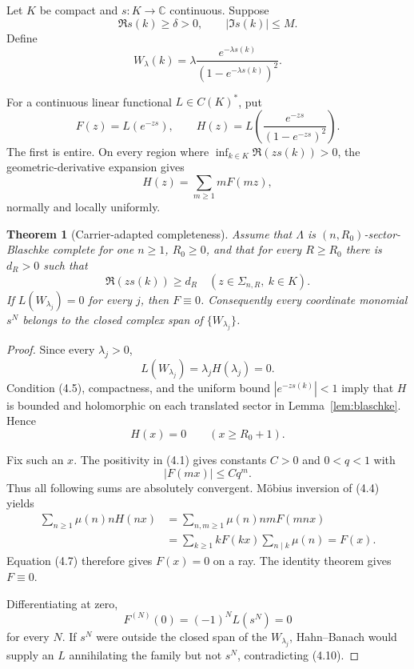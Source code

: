 \documentclass[11pt]{article}
\newtheorem{theorem}{Theorem}[section]
\newcommand{\C}{\mathbb C}
\begin{document}
Let \(K\) be compact and \(s:K\to\C\) continuous.  Suppose
\[
 \Re s(k)\geq\delta>0,\qquad |\Im s(k)|\leq M.
 \tag{4.1}
\]
Define
\[
 W_\lambda(k)
 =\lambda\frac{e^{-\lambda s(k)}}{(1-e^{-\lambda s(k)})^2}.
 \tag{4.2}
\]

For a continuous linear functional \(L\in C(K)^*\), put
\[
 F(z)=L(e^{-zs}),\qquad
 H(z)=L\!\left(\frac{e^{-zs}}{(1-e^{-zs})^2}\right).
 \tag{4.3}
\]
The first is entire.  On every region where
\(\inf_{k\in K}\Re(zs(k))>0\), the geometric-derivative expansion gives
\[
 H(z)=\sum_{m\geq1}mF(mz),
 \tag{4.4}
\]
normally and locally uniformly.

\begin{theorem}[Carrier-adapted completeness]\label{thm:carrier}
Assume that \(\Lambda\) is \((n,R_0)\)-sector-Blaschke complete for one
\(n\geq1\), \(R_0\geq0\), and that for every \(R\geq R_0\) there is
\(d_R>0\) such that
\[
 \Re(zs(k))\geq d_R
 \quad(z\in\Sigma_{n,R},\ k\in K).
 \tag{4.5}
\]
If \(L(W_{\lambda_j})=0\) for every \(j\), then \(F\equiv0\).  Consequently
every coordinate monomial \(s^N\) belongs to the closed complex span of
\(\{W_{\lambda_j}\}\).
\end{theorem}

\begin{proof}
Since every \(\lambda_j>0\),
\[
 L(W_{\lambda_j})=\lambda_j H(\lambda_j)=0.
 \tag{4.6}
\]
Condition (4.5), compactness, and the uniform bound
\(|e^{-zs(k)}|<1\) imply that \(H\) is bounded and holomorphic on each
translated sector in Lemma~\ref{lem:blaschke}.  Hence
\[
 H(x)=0\qquad(x\geq R_0+1).
 \tag{4.7}
\]

Fix such an \(x\).  The positivity in (4.1) gives constants \(C>0\) and
\(0<q<1\) with
\[
 |F(mx)|\leq Cq^m.
 \tag{4.8}
\]
Thus all following sums are absolutely convergent.  M\"obius inversion of
\textup{(4.4)} yields
\[
\begin{aligned}
 \sum_{n\geq1}\mu(n)nH(nx)
 &=\sum_{n,m\geq1}\mu(n)nmF(mnx)\\
 &=\sum_{k\geq1}kF(kx)\sum_{n\mid k}\mu(n)
 =F(x).
\end{aligned}
\tag{4.9}
\]
Equation (4.7) therefore gives \(F(x)=0\) on a ray.  The identity theorem gives
\(F\equiv0\).

Differentiating at zero,
\[
 F^{(N)}(0)=(-1)^N L(s^N)=0
 \tag{4.10}
\]
for every \(N\).  If \(s^N\) were outside the closed span of the
\(W_{\lambda_j}\), Hahn--Banach would supply an \(L\) annihilating the family
but not \(s^N\), contradicting (4.10).
\end{proof}
\end{document}
